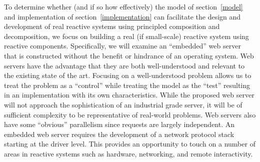 To determine whether (and if so how effectively) the model of section~\ref{model} and implementation of section~\ref{implementation} can facilitate the design and development of real reactive systems using principled composition and decomposition, we focus on building a real (if small-scale) reactive system using reactive components.
Specifically, we will examine an ``embedded'' web server that is constructed without the benefit or hindrance of an operating system.
Web servers have the advantage that they are both well-understood and relevant to the existing state of the art.
Focusing on a well-understood problem allows us to treat the problem as a ``control'' while treating the model as the ``test'' resulting in an implementation with its own characteristics.
While the proposed web server will not approach the sophistication of an industrial grade server, it will be of sufficient complexity to be representative of real-world problems.
Web servers also have some ``obvious'' parallelism since requests are largely independent.
An embedded web server requires the development of a network protocol stack starting at the driver level.
This provides an opportunity to touch on a number of areas in reactive systems such as hardware, networking, and remote interactivity.


